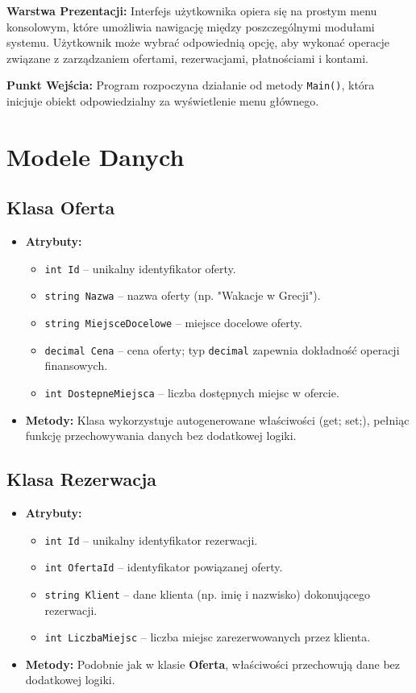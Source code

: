 \noindent \textbf{Warstwa Prezentacji:}
Interfejs użytkownika opiera się na prostym menu konsolowym, które umożliwia nawigację między poszczególnymi modułami systemu. Użytkownik może wybrać odpowiednią opcję, aby wykonać operacje związane z zarządzaniem ofertami, rezerwacjami, płatnościami i kontami.

\noindent \textbf{Punkt Wejścia:}
Program rozpoczyna działanie od metody \texttt{Main()}, która inicjuje obiekt odpowiedzialny za wyświetlenie menu głównego.



\section{Modele Danych}
\subsection*{Klasa \textbf{Oferta}}
\begin{itemize}
    \item \textbf{Atrybuty:}
    \begin{itemize}
        \item \texttt{int Id} -- unikalny identyfikator oferty.
        \item \texttt{string Nazwa} -- nazwa oferty (np. "Wakacje w Grecji").
        \item \texttt{string MiejsceDocelowe} -- miejsce docelowe oferty.
        \item \texttt{decimal Cena} -- cena oferty; typ \texttt{decimal} zapewnia dokładność operacji finansowych.
        \item \texttt{int DostepneMiejsca} -- liczba dostępnych miejsc w ofercie.
    \end{itemize}
    \item \textbf{Metody:}  
    Klasa wykorzystuje autogenerowane właściwości (get; set;), pełniąc funkcję przechowywania danych bez dodatkowej logiki.
\end{itemize}

\subsection*{Klasa \textbf{Rezerwacja}}
\begin{itemize}
    \item \textbf{Atrybuty:}
    \begin{itemize}
        \item \texttt{int Id} -- unikalny identyfikator rezerwacji.
        \item \texttt{int OfertaId} -- identyfikator powiązanej oferty.
        \item \texttt{string Klient} -- dane klienta (np. imię i nazwisko) dokonującego rezerwacji.
        \item \texttt{int LiczbaMiejsc} -- liczba miejsc zarezerwowanych przez klienta.
    \end{itemize}
    \item \textbf{Metody:}  
    Podobnie jak w klasie \textbf{Oferta}, właściwości przechowują dane bez dodatkowej logiki.
\end{itemize}

